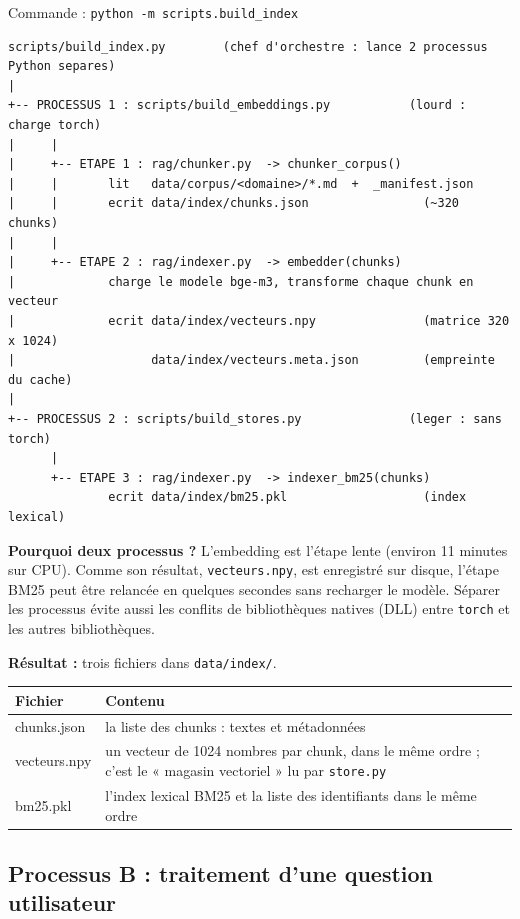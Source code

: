 \documentclass[11pt,a4paper]{article}
\newcommand{\fichier}[1]{\texttt{#1}}
\begin{document}
Commande : \texttt{python -m scripts.build\_index}

\begin{shaded}
\begin{Verbatim}[fontsize=\footnotesize]
scripts/build_index.py        (chef d'orchestre : lance 2 processus Python separes)
|
+-- PROCESSUS 1 : scripts/build_embeddings.py           (lourd : charge torch)
|     |
|     +-- ETAPE 1 : rag/chunker.py  -> chunker_corpus()
|     |       lit   data/corpus/<domaine>/*.md  +  _manifest.json
|     |       ecrit data/index/chunks.json                (~320 chunks)
|     |
|     +-- ETAPE 2 : rag/indexer.py  -> embedder(chunks)
|             charge le modele bge-m3, transforme chaque chunk en vecteur
|             ecrit data/index/vecteurs.npy               (matrice 320 x 1024)
|                   data/index/vecteurs.meta.json         (empreinte du cache)
|
+-- PROCESSUS 2 : scripts/build_stores.py               (leger : sans torch)
      |
      +-- ETAPE 3 : rag/indexer.py  -> indexer_bm25(chunks)
              ecrit data/index/bm25.pkl                   (index lexical)
\end{Verbatim}
\end{shaded}

\textbf{Pourquoi deux processus ?} L'embedding est l'étape lente (environ 11 minutes sur
CPU). Comme son résultat, \fichier{vecteurs.npy}, est enregistré sur disque, l'étape BM25
peut être relancée en quelques secondes sans recharger le modèle. Séparer les processus
évite aussi les conflits de bibliothèques natives (DLL) entre \texttt{torch} et les autres
bibliothèques.

\textbf{Résultat :} trois fichiers dans \fichier{data/index/}.

\begin{longtable}{>{\ttfamily}l p{9.5cm}}
\toprule
\normalfont\textbf{Fichier} & \textbf{Contenu} \\
\midrule
chunks.json  & la liste des chunks : textes et métadonnées \\
vecteurs.npy & un vecteur de 1024 nombres par chunk, dans le même ordre ; c'est le
               « magasin vectoriel » lu par \fichier{store.py} \\
bm25.pkl     & l'index lexical BM25 et la liste des identifiants dans le même ordre \\
\bottomrule
\end{longtable}

\subsection{Processus B : traitement d'une question utilisateur}
\end{document}
